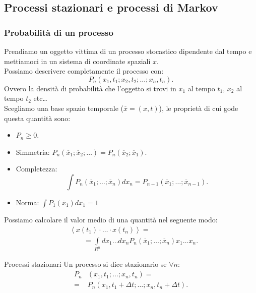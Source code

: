 \subsection{Processi stazionari e processi di Markov}%
\label{sub:Processi stazionari e processi di Markov}
\subsubsection{Probabilità di un processo}%
\label{subsub:Probabilità di un processo}
Prendiamo un oggetto vittima di un processo stocastico dipendente dal tempo e mettiamoci in un sistema di coordinate spaziali $x$. \\
Possiamo descrivere completamente il processo con:
\[
    P_n(x_1,t_1; x_2,t_2; \ldots ; x_n,t_n) 
.\] 
Ovvero la densità di probabilità che l'oggetto si trovi in $x_1$ al tempo $t_1$, $x_2$ al tempo $t_2$ etc\ldots \\
Scegliamo una base spazio temporale ($\overline{x} = (x,t)$), le proprietà di cui gode questa quantità sono:
\begin{itemize}
    \item $P_n \ge 0$.
    \item Simmetria: $P_n(\overline{x}_1;\overline{x}_2; \ldots) = P_n(\overline{x}_2; \overline{x}_1)$.
    \item Completezza:
	\[
	    \int P_n(\overline{x}_1;\ldots;\overline{x}_n) dx_n = P_{n-1}(\overline{x}_1;\ldots;\overline{x}_{n-1}) 
	.\] 
    \item Norma: $\int P_1(\overline{x}_1) dx_1 = 1$ 
\end{itemize}
Possiamo calcolare il valor medio di una quantità nel seguente modo:
\[\begin{aligned}
    &\left< x(t_1) \cdot \ldots \cdot x(t_n) \right> =\\
			     & \qquad=\int\limits_{R^n} dx_1\ldots dx_n P_n(\overline{x}_1;\ldots ;\overline{x}_n) x_1 \ldots x_n
.\end{aligned}\]


\begin{greenbox}{Processi stazionari}
    Un processo si dice stazionario se $\forall n$:
    \[\begin{aligned}
	P_n&(x_1,t_1;\ldots;x_n,t_n) =\\
	=&P_n(x_1,t_1+\Delta t;\ldots;x_n,t_n+\Delta t)
    .\end{aligned}\]
\end{greenbox}
\noindent
